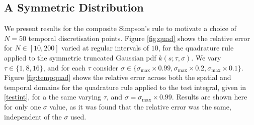 \subsection{A Symmetric Distribution}
We present results for the composite Simpson's rule to motivate a choice of $N=50$ temporal discretisation points. Figure \ref{fig:quad} shows the relative error for $N\in[10,200]$ varied at regular intervals of $10$, for the quadrature rule applied to the symmetric truncated Gaussian pdf $k(s;\tau,\sigma)$. We vary $\tau\in\{1,8,16\}$, and for each $\tau$ consider $\sigma\in\{\sigma_{\max}\times0.99,\sigma_{\max}\times0.2,\sigma_{\max}\times0.1\}$. Figure \ref{fig:tempquad} shows the relative error across both the spatial and temporal domains for the quadrature rule applied to the test integral, given in \eqref{testint}, for a the same varying $\tau$, and $\sigma=\sigma_{\max}\times0.99$. Results are shown here for only one $\sigma$ value, as it was found that the relative error was the same, independent of the $\sigma$ used.

